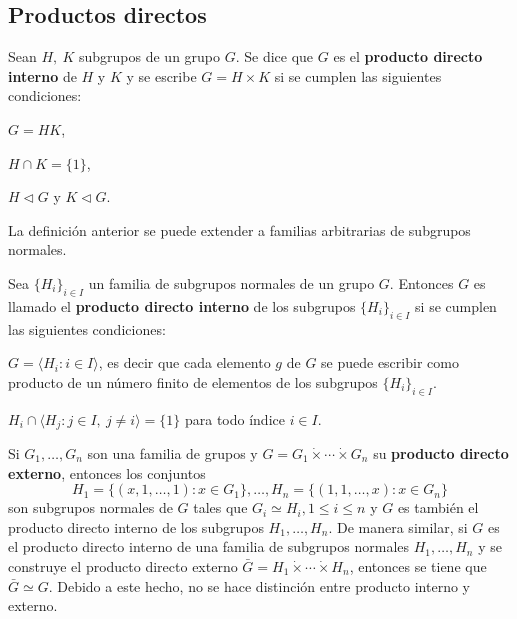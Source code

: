 \subsection{Productos directos}
\begin{definicion}
Sean $H,\ K$ subgrupos de un grupo $G$. Se dice que $G$ es el \textbf{producto directo interno} de $H$ y $K$ y se escribe $G = H \times K$ si se cumplen las siguientes condiciones:
\begin{bulletList}
\item $G=HK$,
\item $H \cap K = \{1\}$,
\item $H \triangleleft G$ y $K \triangleleft G$.
\end{bulletList}
\end{definicion}
La definición anterior se puede extender a familias arbitrarias de subgrupos normales.
\begin{definicion}
Sea $\{H_i\}_{i \in I}$ un familia de subgrupos normales de un grupo $G$. Entonces $G$ es llamado el \textbf{producto directo interno} de los subgrupos $\{H_i\}_{i \in I}$ si se cumplen las siguientes condiciones:
\begin{bulletList}
\item $G =\langle H_i \colon i \in I \rangle$, es decir que cada elemento $g$ de $G$ se puede escribir como producto de un número finito de elementos de los subgrupos $\{H_i\}_{i \in I}$.
\item $H_i \cap \langle H_j \colon j \in I, \ j \neq i \rangle = \{1\}$ para todo índice $i \in I$.
\end{bulletList}
\end{definicion} 
Si $G_1, \dots, G_n$ son una familia de grupos y $G = G_1\dot{\times}\cdots\dot{\times}G_n$ su \textbf{producto directo externo}, entonces los conjuntos
\[ H_1=\{(x,1,\dots,1)\colon x \in G_1\},\dots,H_n=\{(1,1,\dots,x)\colon x \in G_n \} \] son subgrupos normales de $G$ tales que $G_i \simeq H_i,1\leq i \leq n$ y $G$ es también el producto directo interno de los subgrupos $H_1, \dots, H_n$.
De manera similar, si $G$ es el producto directo interno de una familia de subgrupos normales $H_1,\dots,H_n$ y se construye el producto directo externo $\bar{G} = H_1\dot{\times}\cdots\dot{\times}H_n$, entonces se tiene que $\bar{G} \simeq G$. Debido a este hecho, no se hace distinción entre producto interno y externo.
